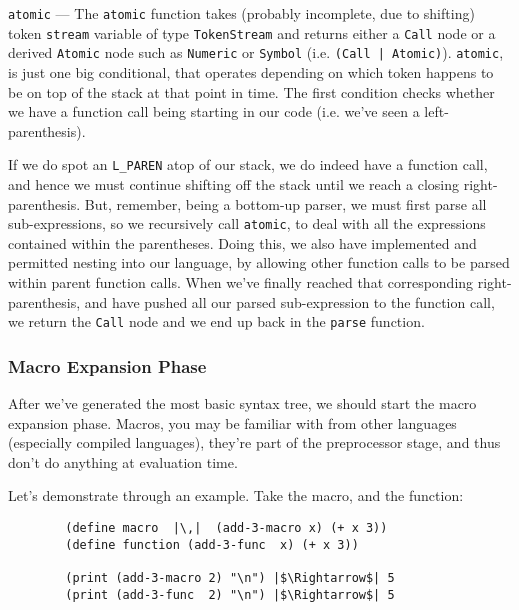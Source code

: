 \documentclass{article}
\newcommand{\code}[1]{\texttt{#1}}
\begin{document}
      \code{atomic} --- The \code{atomic} function takes (probably incomplete,
      due to shifting) token \code{stream} variable of
      type \code{TokenStream} and returns either a \code{Call} node or a derived
      \code{Atomic} node such as \code{Numeric} or \code{Symbol} (i.e.
      \code{(Call | Atomic)}). \code{atomic}, is just one big conditional, that
      operates depending on which token happens to be on top of the stack at that
      point in time.  The first condition checks whether we have a function call
      being starting in our code (i.e. we've seen a left-parenthesis).

      \begin{adjustwidth}{1cm}{}
      \indent \indent If we do spot an \code{L\_PAREN}
      atop of our stack, we do indeed have a function call,
      and hence we must continue shifting off the stack until we reach a closing
      right-parenthesis.  But, remember, being a bottom-up parser, we must first
      parse all sub-expressions, so we recursively call \code{atomic}, to deal
      with all the expressions contained within the parentheses. Doing this, we
      also have implemented and permitted nesting into our language, by allowing
      other function calls to be parsed within parent function calls. When we've
      finally reached that corresponding right-parenthesis, and have pushed all
      our parsed sub-expression to the function call, we return the \code{Call}
      node and we end up back in the \code{parse} function.
      \end{adjustwidth}

      \clearpage

      \subsubsection{Macro Expansion Phase}
      After we've generated the most basic syntax tree, we should start the macro
      expansion phase.  Macros, you may be familiar with from other languages
      (especially compiled languages), they're part of the preprocessor stage,
      and thus don't do anything at evaluation time.

      Let's demonstrate through an example. Take the macro, and the function:

      \begin{verbatim}
        (define macro  |\,|  (add-3-macro x) (+ x 3))
        (define function (add-3-func  x) (+ x 3))

        (print (add-3-macro 2) "\n") |$\Rightarrow$| 5
        (print (add-3-func  2) "\n") |$\Rightarrow$| 5
      \end{verbatim}
\end{document}
